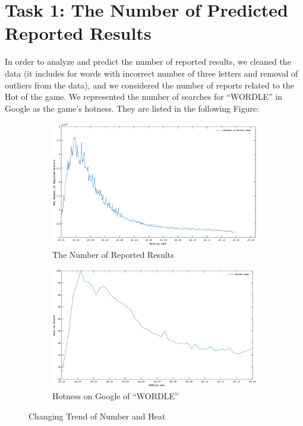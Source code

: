 \documentclass[12pt]{article}  %
\begin{document}
\section{{\sc \textbf{Task 1}}: The Number of Predicted Reported Results}
In order to analyze and predict the number of reported results, we cleaned the data (it includes for words with incorrect number of three letters and removal of outliers from the data), and we considered the number of reports related to the Hot of the game. We represented the number of searches for ``WORDLE'' in Google as the game's hotness. They are listed in the following Figure:
\begin{figure}[htbp]
\centering
\begin{subfigure}[b]{.49\textwidth}
\includegraphics[width=\textwidth]{img/yuanshi.eps}\caption{The Number of Reported Results}
\end{subfigure}
\begin{subfigure}[b]{.49\textwidth}
\includegraphics[width=\textwidth]{img/heat.eps}\caption{Hotness on Google of ``WORDLE''}
\end{subfigure}
\caption{Changing Trend of Number and Heat}\label{Changing Trend of Number and Heat}
\end{figure}
\end{document}

